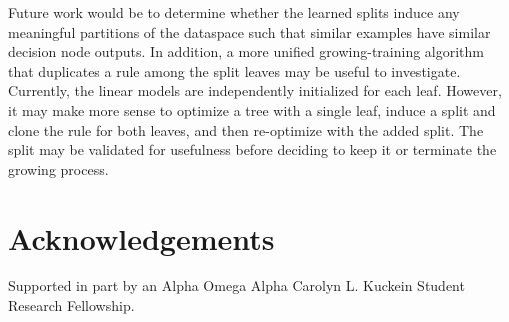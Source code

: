 \documentclass[a4paper,11pt,final]{article}
\begin{document}
Future work would be to determine whether the learned splits induce any meaningful partitions of the dataspace such that similar examples have similar decision node outputs. In addition, a more unified growing-training algorithm that duplicates a rule among the split leaves may be useful to investigate. Currently, the linear models are independently initialized for each leaf. However, it may make more sense to optimize a tree with a single leaf, induce a split and clone the rule for both leaves, and then re-optimize with the added split. The split may be validated for usefulness before deciding to keep it or terminate the growing process.

\section{Acknowledgements}

Supported in part by an Alpha Omega Alpha Carolyn L. Kuckein Student Research Fellowship.



\end{document}
